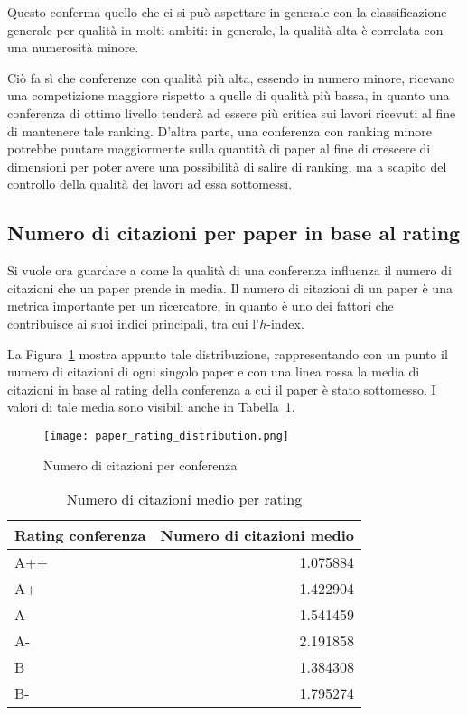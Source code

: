 Questo conferma quello che ci si può aspettare in generale con la classificazione
generale per qualità in molti ambiti: in generale, la qualità alta è correlata
con una numerosità minore.

Ciò fa sì che conferenze con qualità più alta, essendo in numero minore,
ricevano una competizione maggiore rispetto a quelle di qualità più bassa, in
quanto una conferenza di ottimo livello tenderà ad essere più critica sui lavori
ricevuti al fine di mantenere tale ranking. D'altra parte, una conferenza con
ranking minore potrebbe puntare maggiormente sulla quantità di paper al fine di
crescere di dimensioni per poter avere una possibilità di salire di ranking,
ma a scapito del controllo della qualità dei lavori ad essa sottomessi.

\subsection{Numero di citazioni per paper in base al rating}

Si vuole ora guardare a come la qualità di una conferenza influenza il numero
di citazioni che un paper prende in media. Il numero di citazioni di un paper
è una metrica importante per un ricercatore, in quanto è uno dei fattori
che contribuisce ai suoi indici principali, tra cui l'$h$-index.

La Figura~\ref{fig:paper-rating-distribution} mostra appunto tale distribuzione,
rappresentando con un punto il numero di citazioni di ogni singolo paper e
con una linea rossa la media di citazioni in base al rating della conferenza
a cui il paper è stato sottomesso. I valori di tale media sono visibili
anche in Tabella~\ref{table:paper-rating-distribution}.

\begin{figure}[tb]
  \centering
  \texttt{[image: paper\_rating\_distribution.png]}
  \caption{Numero di citazioni per conferenza}
  \label{fig:paper-rating-distribution}
\end{figure}

\begin{table}[tb]
  \centering
  \begin{tabular}{||l | r ||}
    \hline
    \textbf{Rating conferenza} & \textbf{Numero di citazioni medio} \\ [0.5ex] 
    \hline\hline
    A++    & 1.075884 \\ \hline
    A+     & 1.422904 \\ \hline
    A      & 1.541459 \\ \hline
    A-     & 2.191858 \\ \hline
    B      & 1.384308 \\ \hline
    B-     & 1.795274 \\ \hline
  \end{tabular}
  \caption{Numero di citazioni medio per rating}
  \label{table:paper-rating-distribution}
\end{table}

